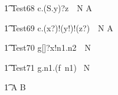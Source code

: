 \begin{circusaction}
   \t1 Test68 \circdef c.(S.y)?z~\circat~N \then {} \rcirctime A \\
\end{circusaction}

\begin{circusaction}
   \t1 Test69 \circdef c.(x?)!(y!)!(z?)~\circat~N \then {} \rcirctime A\\
\end{circusaction}

\begin{circusaction}
 \t1 Test70 \circdef g[\nat \cross \nat \cross \nat]?x!n1.n2~\circat~N \then {} \rcirctime \Skip
\end{circusaction}

\begin{circusaction}
   \t1 Test71 \circdef g.n1.(f~n1) \circat~N \then {} \rcirctime \Skip
\end{circusaction}

\begin{circusaction}        
        \t1 \circspot A \circseq B\\
\end{circusaction}

\begin{circus}    
\circend
\end{circus}
